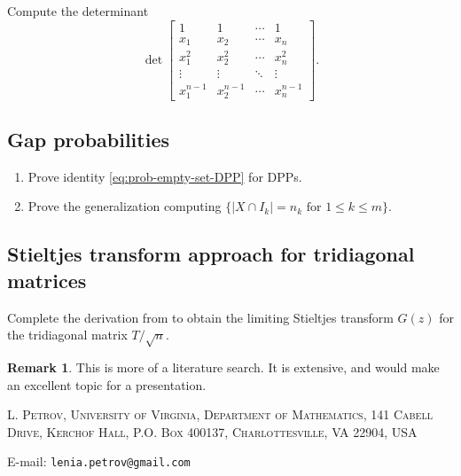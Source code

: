 \documentclass[letterpaper,11pt,oneside,reqno]{article}
\numberwithin{equation}{section}
\theoremstyle{definition}
\newtheorem{remark}[proposition]{Remark}
\begin{document}
Compute the determinant
\begin{equation*}
	\det\left[
		\begin{array}{cccc}
			1 & 1 & \cdots & 1 \\
			x_1 & x_2 & \cdots & x_n \\
			x_1^2 & x_2^2 & \cdots & x_n^2 \\
			\vdots & \vdots & \ddots & \vdots \\
			x_1^{n-1} & x_2^{n-1} & \cdots & x_n^{n-1}
		\end{array}
	\right].
\end{equation*}

\subsection{Gap probabilities}

\begin{enumerate}
	\item 
Prove identity 
\eqref{eq:prob-empty-set-DPP} for DPPs.
\item Prove the generalization computing 
	\(\{|X\cap I_k|=n_k\text{ for }1\le k\le m\}\).
\end{enumerate}


\subsection{Stieltjes transform approach for tridiagonal matrices}
\label{prob:resolvent-diff-eq}

Complete the derivation from  to obtain the limiting Stieltjes transform $G(z)$ for the tridiagonal matrix $T/\sqrt{n}$.

\begin{remark}
	This is more of a literature search. It is extensive, and 
	would make an excellent topic for a presentation.
\end{remark}





\medskip

\textsc{L. Petrov, University of Virginia, Department of Mathematics, 141 Cabell Drive, Kerchof Hall, P.O. Box 400137, Charlottesville, VA 22904, USA}

E-mail: \texttt{lenia.petrov@gmail.com}
\end{document}
